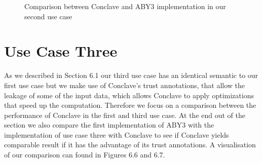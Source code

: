 \begin{figure}[H]
	\caption{Comparison between Conclave and ABY3 implementation in our second use case}
\end{figure}



\section{Use Case Three}
As we described in Section 6.1 our third use case has an identical semantic to our first use case but we make use of Conclave's trust annotations, that allow the leakage of some of the input data, which allows Conclave to apply optimizations that speed up the computation. Therefore we focus on a comparison between the performance of Conclave in the first and third use case. At the end out of the section we also compare the first implementation of ABY3 with the implementation of use case three with Conclave to see if Conclave yields comparable result if it has the advantage of its trust annotations.
 A visualisation of our comparison can found in Figures 6.6 and 6.7. 
